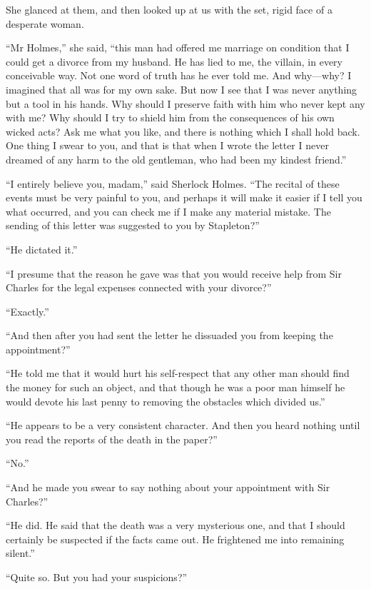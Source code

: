 \documentclass[paper=a5,BCOR=7mm,twoside,DIV=calc,12pt,usegeometry,openany,chapterprefix,endperiod,headings=big]{scrbook} %
\begin{document}
She glanced at them, and then looked up at us with the set, rigid face of a desperate woman.

\enquote{Mr Holmes,} she said, \enquote{this man had offered me marriage on condition that I could get a divorce from my husband. He has lied to me, the villain, in every conceivable way. Not one word of truth has he ever told me. And why---why? I imagined that all was for my own sake. But now I see that I was never anything but a tool in his hands. Why should I preserve faith with him who never kept any with me? Why should I try to shield him from the consequences of his own wicked acts? Ask me what you like, and there is nothing which I shall hold back. One thing I swear to you, and that is that when I wrote the letter I never dreamed of any harm to the old gentleman, who had been my kindest friend.}

\enquote{I entirely believe you, madam,} said Sherlock Holmes. \enquote{The recital of these events must be very painful to you, and perhaps it will make it easier if I tell you what occurred, and you can check me if I make any material mistake. The sending of this letter was suggested to you by Stapleton?}

\enquote{He dictated it.}

\enquote{I presume that the reason he gave was that you would receive help from Sir Charles for the legal expenses connected with your divorce?}

\enquote{Exactly.}

\enquote{And then after you had sent the letter he dissuaded you from keeping the appointment?}

\enquote{He told me that it would hurt his self-respect that any other man should find the money for such an object, and that though he was a poor man himself he would devote his last penny to removing the obstacles which divided us.}

\enquote{He appears to be a very consistent character. And then you heard nothing until you read the reports of the death in the paper?}

\enquote{No.}

\enquote{And he made you swear to say nothing about your appointment with Sir Charles?}

\enquote{He did. He said that the death was a very mysterious one, and that I should certainly be suspected if the facts came out. He frightened me into remaining silent.}

\enquote{Quite so. But you had your suspicions?}
\end{document}

